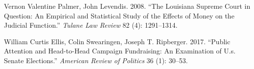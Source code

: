 \documentclass[11pt,]{article}
\begin{document}
\leavevmode\hypertarget{ref-palmer2008}{}%
Vernon Valentine Palmer, John Levendis. 2008. ``The Louisiana Supreme
Court in Question: An Empirical and Statistical Study of the Effects of
Money on the Judicial Function.'' \emph{Tulane Law Review} 82 (4):
1291--1314.

\leavevmode\hypertarget{ref-ellis2017}{}%
William Curtis Ellis, Colin Swearingen, Joseph T. Ripberger. 2017.
``Public Attention and Head-to-Head Campaign Fundraising: An Examination
of U.s. Senate Elections.'' \emph{American Review of Politics} 36 (1):
30--53.





\newpage
\singlespacing 
\end{document}
